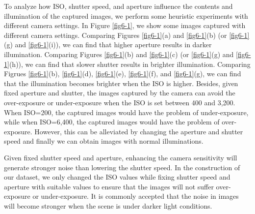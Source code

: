 To analyze how ISO, shutter speed, and aperture influence the contents and illumination of the captured images, we perform some heuristic experiments with different camera settings. In Figure \ref{fig6-1}, we show some images captured with different camera settings. Comparing Figures \ref{fig6-1}(a) and \ref{fig6-1}(b) (or \ref{fig6-1}(g) and \ref{fig6-1}(i)), we can find that higher aperture results in darker illumination. Comparing Figures \ref{fig6-1}(b) and \ref{fig6-1}(c) (or \ref{fig6-1}(g) and \ref{fig6-1}(h)), we can find that slower shutter results in brighter illumination. Comparing Figrues \ref{fig6-1}(b), \ref{fig6-1}(d), \ref{fig6-1}(e), \ref{fig6-1}(f), and \ref{fig6-1}(g), we can find that the illumination becomes brighter when the ISO is higher. Besides, given fixed aperture and shutter, the images captured by the camera can avoid the over-exposure or under-exposure when the ISO is set between 400 and 3,200. When ISO=200, the captured images would have the problem of under-exposure, while when ISO=6,400, the captured images would have the problem of over-exposure. However, this can be alleviated by changing the aperture and shutter speed and finally we can obtain images with normal illuminations.

Given fixed shutter speed and aperture, enhancing the camera sensitivity will generate stronger noise than lowering the shutter speed. In the construction of our dataset, we only changed the ISO values while fixing shutter speed and aperture with suitable values to ensure that the images will not suffer over-exposure or under-exposure. It is commonly accepted that the noise in images will become stronger when the scene is under darker light conditions.



